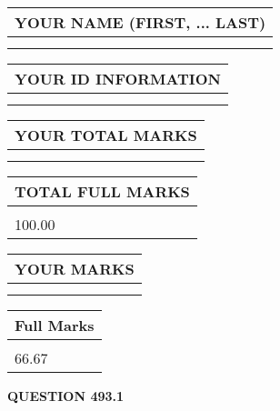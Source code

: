 \documentclass{ctexart}
\begin{document}
   
   
   
\newpage 
\setcounter{page}{ 
   493001 } 
   
   
   
   
\noindent\begin{tabular}{|l|}
\hline
YOUR NAME (FIRST, ... LAST)  \\
\hline
 \\ 
 \\ 
\hline
\end{tabular}
\hspace{0.05in} \begin{tabular}{|l|}
\hline
 YOUR   ID   INFORMATION  \\
\hline
 \\ 
 \\ 
\hline
\end{tabular}
   
   
\vspace{0.2in}\noindent\begin{tabular}{|l|}
\hline
YOUR TOTAL MARKS  \\
\hline
 \\ 
 \\ 
\hline
\end{tabular}
\hspace{0.05in} \begin{tabular}{|l|}
\hline
TOTAL FULL MARKS  \\
\hline
 \\ 
100.00 \\
\hline
\end{tabular}
   
   
 \vspace{0.2in}
 
 
 
 
   
   
  
\vspace{0.2in}
  
\noindent\begin{tabular}{|l|}
\hline
 YOUR MARKS  \\
\hline
 \\ 
 \\ 
\hline
\end{tabular}
\hspace{0.05in} \begin{tabular}{|l|}
\hline
 Full Marks  \\
\hline
 \\ 
66.67 \\
\hline
\end{tabular}
{\textbf{\Large{QUESTION
493.1 
}}}
  
\end{document}
